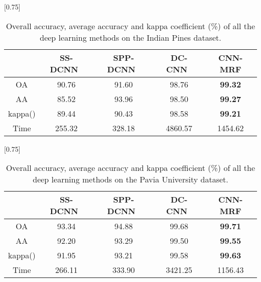 \documentclass[journal]{IEEEtran}
\begin{document}
		\begin{table}[htp]
			\caption{\label{Indian-cnn-based-results} {{Overall accuracy, average accuracy and kappa coefficient (\%) of all the deep learning methods on the Indian Pines dataset.}}}
			\begin{center}
				{\normalsize
					\scalebox{0.75}[0.75]
					{
						\begin{tabular}{|c|c|c|c|c|}
							\hline
							& SS-DCNN~\cite{yue2015spectral}  & SPP-DCNN~\cite{yue2016deep}     & DC-CNN~\cite{zhang2017spectral}     & CNN-MRF \\
							\hline
							OA       & 90.76    & 91.60    & 98.76      &  \bf{99.32} \\
							\hline
							AA       & 85.52    & 93.96    & 98.50      &  \bf{99.27}\\
							\hline
							kappa()  & 89.44    & 90.43    & 98.58  &  \bf{99.21} \\
							\hline
							Time     & 255.32   & 328.18   & 4860.57    &  1454.62\\
							\hline
							
						\end{tabular}
					}
				}
			\end{center}
		\end{table}
		
		\begin{table}[htp]
			\caption{\label{paviaU-cnn-based-results} {{Overall accuracy, average accuracy and kappa coefficient (\%) of all the deep learning methods on the Pavia University dataset.}}}
			\begin{center}
				{\normalsize
					\scalebox{0.75}[0.75]
					{
						\begin{tabular}{|c|c|c|c|c|}
							\hline
							& SS-DCNN~\cite{yue2015spectral}  & SPP-DCNN~\cite{yue2016deep}    & DC-CNN~\cite{zhang2017spectral}   & CNN-MRF \\
							\hline
							OA       & 93.34    & 94.88    & 99.68      & \bf{99.71} \\
							\hline
							AA       & 92.20    & 93.29    & 99.50      & \bf{99.55} \\
							\hline
							kappa()  & 91.95    & 93.21    & 99.58  & \bf{99.63} \\
							\hline
							Time     & 266.11   & 333.90   & 3421.25    & 1156.43\\
							\hline
							
						\end{tabular}
					}
				}
			\end{center}
		\end{table}
		
\end{document}

